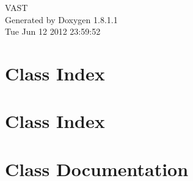 \documentclass{book}
\begin{document}
\hypersetup{pageanchor=false,citecolor=blue}
\begin{titlepage}
\vspace*{7cm}
\begin{center}
{\Large V\-A\-S\-T }\\
\vspace*{1cm}
{\large Generated by Doxygen 1.8.1.1}\\
\vspace*{0.5cm}
{\small Tue Jun 12 2012 23:59:52}\\
\end{center}
\end{titlepage}
\clearemptydoublepage
{}
\tableofcontents
\clearemptydoublepage
{}
\hypersetup{pageanchor=true,citecolor=blue}
\chapter{Class Index}

\chapter{Class Index}

\chapter{Class Documentation}



























\printindex
\end{document}
